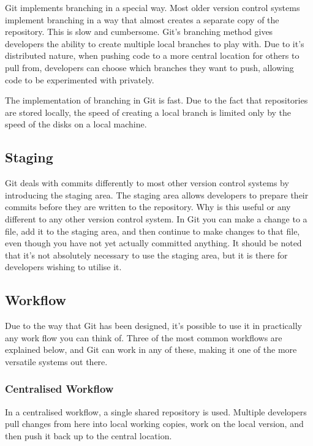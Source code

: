 Git implements branching in a special way.
Most older version control systems implement branching in a way that almost creates a separate copy of the repository.
This is slow and cumbersome.
Git's branching method gives developers the ability to create multiple local branches to play with.
Due to it's distributed nature, when pushing code to a more central location for others to pull from, developers can choose which branches they want to push, allowing code to be experimented with privately.

The implementation of branching in Git is fast.
Due to the fact that repositories are stored locally, the speed of creating a local branch is limited only by the speed of the disks on a local machine.

\subsection{Staging}

Git deals with commits differently to most other version control systems by introducing the staging area.
The staging area allows developers to prepare their commits before they are written to the repository.
Why is this useful or any different to any other version control system.
In Git you can make a change to a file, add it to the staging area, and then continue to make changes to that file, even though you have not yet actually committed anything.
It should be noted that it's not absolutely necessary to use the staging area, but it is there for developers wishing to utilise it.

\subsection{Workflow}

Due to the way that Git has been designed, it's possible to use it in practically any work flow you can think of.
Three of the most common workflows are explained below, and Git can work in any of these, making it one of the more versatile systems out there.

\subsubsection{Centralised Workflow}

In a centralised workflow, a single shared repository is used.
Multiple developers pull changes from here into local working copies, work on the local version, and then push it back up to the central location.

